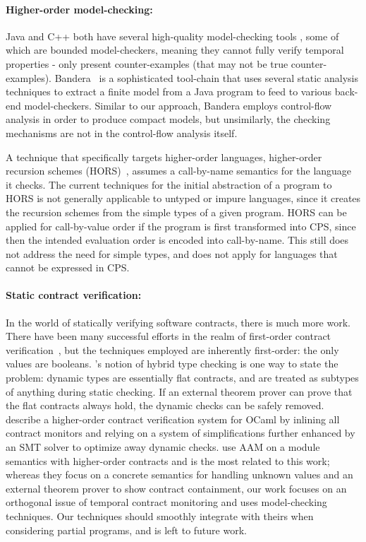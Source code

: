 \documentclass[preprint,onecolumn,9pt]{sigplanconf} %
\begin{document}
\paragraph{Higher-order model-checking:}
Java and C++ both have several high-quality model-checking tools \citep{ianjohnson:bandera, ianjohnson:java-pathfinder, ianjohnson:LLBMC}, some of which are bounded model-checkers, meaning they cannot fully verify temporal properties - only present counter-examples (that may not be true counter-examples).
%
Bandera~\citep{ianjohnson:bandera} is a sophisticated tool-chain that uses several static analysis techniques to extract a finite model from a Java program to feed to various back-end model-checkers.
%
Similar to our approach, Bandera employs control-flow analysis in order to produce compact models, but unsimilarly, the checking mechanisms are not in the control-flow analysis itself.

A technique that specifically targets higher-order languages, higher-order recursion schemes (HORS)~\citep{ianjohnson:Knapik:2002:HPT:646794.704852}, assumes a call-by-name semantics for the language it checks.
%
The current techniques for the initial abstraction of a program to HORS is not generally applicable to untyped or impure languages, since it creates the recursion schemes from the simple types of a given program.
%
HORS can be applied for call-by-value order if the program is first transformed into CPS, since then the intended evaluation order is encoded into call-by-name.
%
This still does not address the need for simple types, and does not apply for languages that cannot be expressed in CPS.

\paragraph{Static contract verification:}
In the world of statically verifying software contracts, there is much more work.
%
There have been many successful efforts in the realm of first-order contract verification~\citep{ianjohnson:fahndrich:contracts:2011,ianjohnson:vcc:2009}, but the techniques employed are inherently first-order: the only values are booleans.
%
\citet{ianjohnson:Flanagan:2006:HTC:1111037.1111059}'s notion of hybrid type checking is one way to state the problem: dynamic types are essentially flat contracts, and are treated as subtypes of anything during static checking.
%
If an external theorem prover can prove that the flat contracts always hold, the dynamic checks can be safely removed.
%
\citet{dvanhorn:Xu2012Hybrid} describe a higher-order contract verification system for OCaml by inlining all contract monitors and relying on a system of simplifications further enhanced by an SMT solver to optimize away dynamic checks.
%
\citet{dvanhorn:TobinHochstadt2012Higherorder} use AAM on a module semantics with higher-order contracts and is the most related to this work; whereas they focus on a concrete semantics for handling unknown values and an external theorem prover to show contract containment, our work focuses on an orthogonal issue of temporal contract monitoring and uses model-checking techniques.
%
Our techniques should smoothly integrate with theirs when considering partial programs, and is left to future work.
\end{document}
